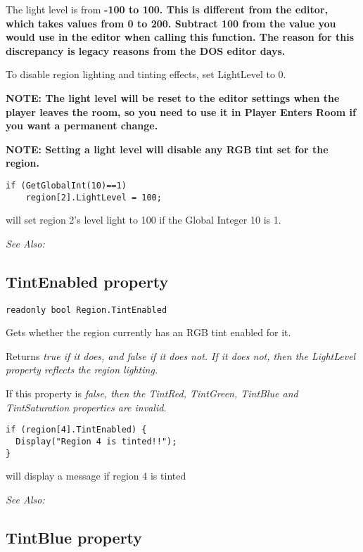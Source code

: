The light level is from \bf{-100 to 100}. This is different from the editor, which
takes values from 0 to 200.
Subtract 100 from the value you would use in the editor when calling this function.
The reason for this discrepancy is legacy reasons from the DOS editor days.

To disable region lighting and tinting effects, set LightLevel to 0.

\bf{NOTE}: The light level will be reset to the editor settings when the player leaves the
room, so you need to use it in Player Enters Room if you want a permanent
change.

\bf{NOTE}: Setting a light level will disable any RGB tint set for the region.

\begin{verbatim}
if (GetGlobalInt(10)==1)
    region[2].LightLevel = 100;
\end{verbatim}
will set region 2's level light to 100 if the Global Integer 10 is 1.

\it{See Also:} 


\subsection{TintEnabled property}\label{Region.TintEnabled}%

\begin{verbatim}
readonly bool Region.TintEnabled
\end{verbatim}
Gets whether the region currently has an RGB tint enabled for it.

Returns \it{true} if it does, and \it{false} if it does not. If it does not, then
the LightLevel property reflects the region lighting.

If this property is \it{false}, then the TintRed, TintGreen, TintBlue and TintSaturation
properties are invalid.

\begin{verbatim}
if (region[4].TintEnabled) {
  Display("Region 4 is tinted!!");
}
\end{verbatim}
will display a message if region 4 is tinted

\it{See Also:} 


\subsection{TintBlue property}\label{Region.TintBlue}%

